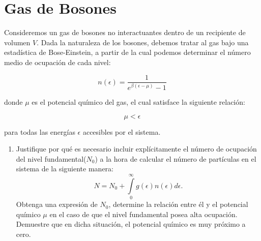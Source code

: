 \documentclass[a4paper,11pt]{article}
\begin{document}
\section{Gas de Bosones}

Consideremos un gas de bosones no interactuantes dentro de un 
recipiente de volumen $V$.
Dada la naturaleza de los bosones, debemos tratar al gas bajo una 
estadística de Bose-Einstein, a partir de la cual podemos determinar el 
número medio de ocupación de cada nivel:

$$ n(\epsilon) = \frac{1}{e^{\beta(\epsilon - \mu)} - 1} $$

\noindent donde $\mu$ es el potencial químico del gas, el cual satisface la 
siguiente relación:

$$ \mu < \epsilon $$

\noindent para todas las energías $\epsilon$ accesibles por el sistema.

\begin{enumerate}[label=(\alph*),
                  leftmargin=2\parindent,
                  rightmargin=2\parindent]

     \item{Justifique por qué es necesario incluir explícitamente el número 
           de ocupación del nivel fundamental($N_0$) a la hora de calcular el 
           número de partículas en el sistema de la siguiente manera:
           $$ 
           N = 
           N_0 + \int\limits_0^\infty g(\epsilon) n(\epsilon) 
           d\epsilon.
           $$
           Obtenga una expresión de $N_0$, determine la relación entre él y el 
           potencial químico $\mu$ en el caso de que el nivel fundamental 
           posea alta ocupación.
           Demuestre que en dicha situación, el potencial químico es muy 
           próximo a cero.
           }

\end{enumerate}
\end{document}
